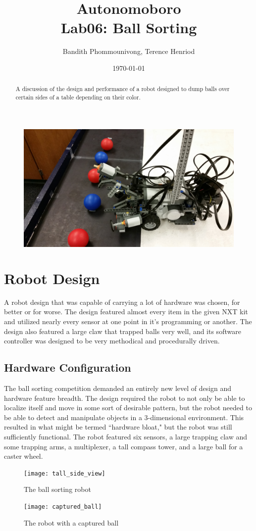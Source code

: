 \documentclass{article}
\title{Autonomoboro \\ Lab06: Ball Sorting}
\author{Bandith Phommounivong, Terence Henriod}
\date{\today}
\begin{document}
\maketitle

\begin{abstract}
A discussion of the design and performance of a robot designed to dump balls over certain sides of a table depending on their color.
\end{abstract}

  \begin{figure}[h!]
    \centering
    \includegraphics[width=.4\linewidth]{side_view}
    \label{fig:cover_pic}
  \end{figure}

\newpage
\section{Robot Design}
A robot design that was capable of carrying a lot of hardware was chosen, for better or for worse. The design featured almost every item in the given NXT kit and utilized nearly every sensor at one point in it's programming or another. The design also featured a large claw that trapped balls very well, and its software controller was designed to be very methodical and procedurally driven.

\subsection{Hardware Configuration}
The ball sorting competition demanded an entirely new level of design and hardware feature breadth. The design required the robot to not only be able to localize itself and move in some sort of desirable pattern, but the robot needed to be able to detect and manipulate objects in a 3-dimensional environment. This resulted in what might be termed ``hardware bloat," but the robot was still sufficiently functional. The robot featured six sensors, a large trapping claw and some trapping arms, a multiplexer, a tall compass tower, and a large ball for a caster wheel.

\begin{figure}[h!]
  \centering
  \begin{minipage}{.5\textwidth}
    \centering
    \texttt{[image: tall\_side\_view]}
    \caption{The ball sorting robot}
    \label{fig:ball_sorting_robot}
  \end{minipage}%
  \begin{minipage}{.5\textwidth}
    \centering
    \texttt{[image: captured\_ball]}
    \caption{The robot with a captured ball}
    \label{fig:captured_ball}
  \end{minipage}
\end{figure}
\end{document}
